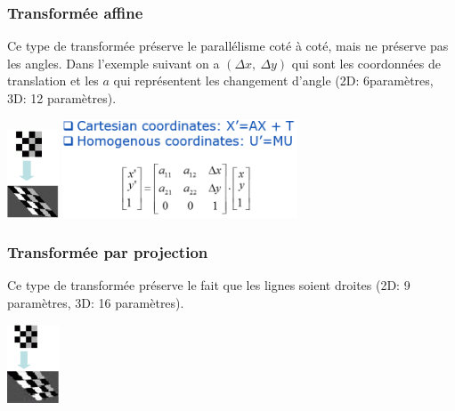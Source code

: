 \documentclass[letterpaper, 12pt]{article}
\newcommand{\alinea}{
\hspace*{0.5cm}}
\begin{document}
		\subsubsection{Transformée affine}
			\alinea Ce type de transformée préserve le parallélisme coté à coté, mais ne préserve pas les angles. 
				Dans l'exemple suivant on a $(\Delta x,\ \Delta y)$ qui sont les coordonnées de translation et les
				$a$ qui représentent les changement d'angle (2D: 6paramètres, 3D: 12 paramètres).
			\begin{center}
				\includegraphics[width=0.6in]{Images/affine} \hfill\includegraphics[width=2.75in]{Images/homogenous_affine}
			\end{center}
		\subsubsection{Transformée par projection}
			\begin{minipage}{0.75\textwidth}
				\alinea Ce type de transformée préserve le fait que les lignes soient droites (2D: 9 paramètres, 3D: 16 paramètres).
			\end{minipage} \hfill
			\begin{minipage}{0.24\textwidth}
				\begin{center}
					\includegraphics[width=0.6in]{Images/projective}
				\end{center}
			\end{minipage}
\end{document}
